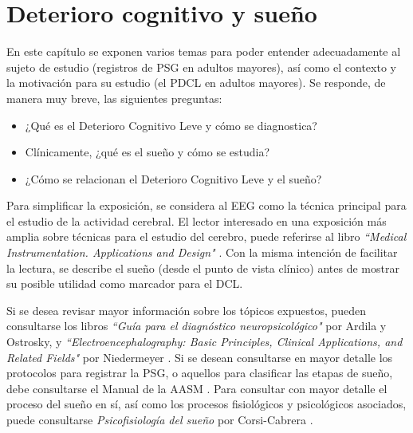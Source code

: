 
\chapter{Deterioro cognitivo y sueño}

En este capítulo se exponen varios temas para poder entender adecuadamente al sujeto de estudio (registros de PSG en adultos mayores), así como el contexto y la motivación para su estudio (el PDCL en adultos mayores).
%
Se responde, de manera muy breve, las siguientes preguntas:
\begin{itemize}
\item ¿Qué es el Deterioro Cognitivo Leve y cómo se diagnostica?
\item Clínicamente, ¿qué es el sueño y cómo se estudia?
\item ¿Cómo se relacionan el Deterioro Cognitivo Leve y el sueño?
\end{itemize}

Para simplificar la exposición, se considera al EEG como la técnica principal para el estudio de la actividad cerebral.
%
El lector interesado en una exposición más amplia sobre técnicas para el estudio del cerebro, puede referirse al libro \textit{``Medical Instrumentation. Applications and Design"} \cite{Webster}.
%
Con la misma intención de facilitar la lectura, se describe el sueño (desde el punto de vista clínico) antes de mostrar su posible utilidad como marcador para el DCL.

Si se desea revisar mayor información sobre los tópicos expuestos, pueden consultarse los libros \textit{``Guía para el diagnóstico neuropsicológico"} \cite{Ardila12} por Ardila y Ostrosky, y \textit{``Electroencephalography: Basic Principles, Clinical Applications, and Related Fields"} por Niedermeyer \cite{niedermeyer}.
%
Si se desean consultarse en mayor detalle los protocolos para registrar la PSG, o aquellos para clasificar las etapas de sueño, debe consultarse el Manual de la AASM \cite{AASM07}.
%
%
%
Para consultar con mayor detalle el proceso del sueño en sí, así como los procesos fisiológicos y psicológicos asociados, puede consultarse \textit{Psicofisiología del sueño} por Corsi-Cabrera \cite{Corsi1983}.

